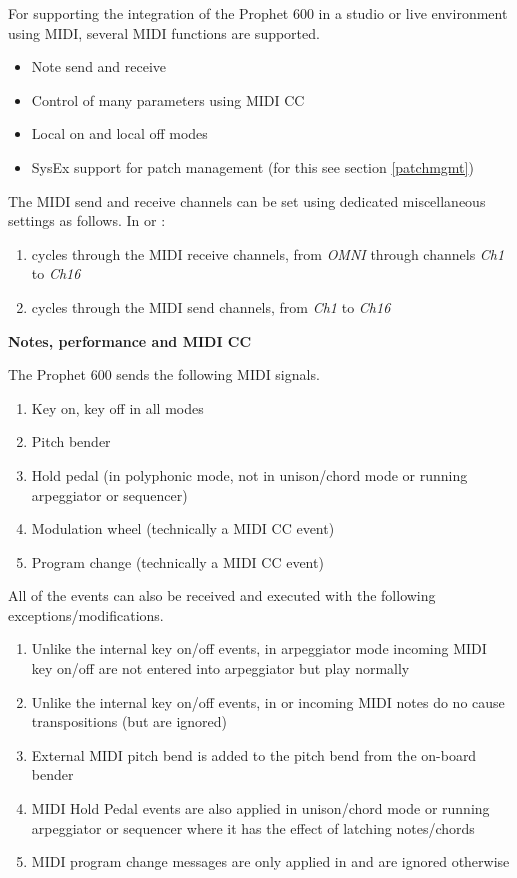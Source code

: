 For supporting the integration of the Prophet 600 in a studio or live environment using MIDI, several MIDI functions are supported.

\begin{itemize}
  \item Note send and receive
  \item Control of many parameters using MIDI CC
  \item Local on and local off modes
  \item SysEx support for patch management (for this see section \ref{patchmgmt})
\end{itemize}

The MIDI send and receive channels can be set using dedicated miscellaneous settings as follows. In \shiftmode or \shiftlock:

\begin{enumerate}
  \setlength\itemsep{0cm}
  \item {} cycles through the MIDI receive channels, from \textit{OMNI} through channels \textit{Ch1} to \textit{Ch16}
  \item {}  cycles through the MIDI send channels, from \textit{Ch1} to \textit{Ch16}
\end{enumerate}

\textbf{Notes, performance and MIDI CC}

The Prophet 600 sends the following MIDI signals. 

\begin{enumerate}
  \setlength\itemsep{0cm}
  \item Key on, key off in all modes
  \item Pitch bender
  \item Hold pedal (in polyphonic mode, not in unison/chord mode or running arpeggiator or sequencer)
  \item Modulation wheel (technically a MIDI CC event)
  \item Program change (technically a MIDI CC event)
\end{enumerate}

All of the events can also be received and executed with the following exceptions/modifications.

\begin{enumerate}
  \setlength\itemsep{0cm}
  \item Unlike the internal key on/off events, in arpeggiator mode incoming MIDI key on/off are not entered into arpeggiator but play normally 
  \item Unlike the internal key on/off events, in \shiftmode or \shiftlock incoming MIDI notes do no cause transpositions (but are ignored) 
  \item External MIDI pitch bend is added to the pitch bend from the on-board bender 
  \item MIDI Hold Pedal events are also applied in unison/chord mode or running arpeggiator or sequencer where it has the effect of latching notes/chords
  \item MIDI program change messages are only applied in \presetmode and are ignored otherwise  
\end{enumerate}

